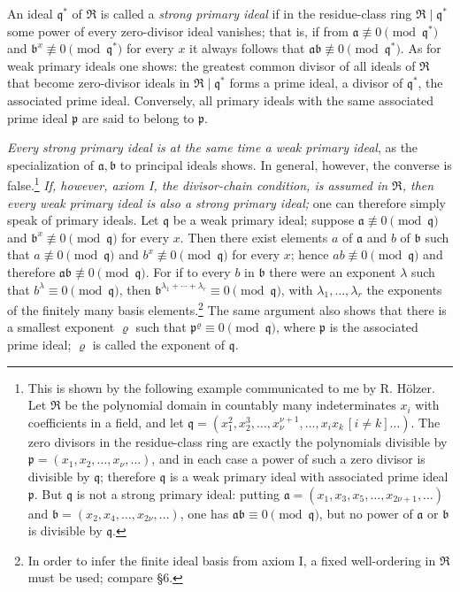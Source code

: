 \documentclass[11pt]{article}
\providecommand{\mR}{\mathfrak{R}}
\providecommand{\ma}{\mathfrak{a}}
\providecommand{\mb}{\mathfrak{b}}
\providecommand{\mpideal}{\mathfrak{p}}
\providecommand{\mq}{\mathfrak{q}}
\begin{document}
An ideal $\mq^*$ of $\mR$ is called a \emph{strong primary ideal} if in the residue-class ring $\mR\mid\mq^*$ some power of every zero-divisor ideal vanishes; that is, if from $\ma\not\equiv0\pmod{\mq^*}$ and $\mb^x\not\equiv0\pmod{\mq^*}$ for every $x$ it always follows that $\ma\mb\not\equiv0\pmod{\mq^*}$. As for weak primary ideals one shows: the greatest common divisor of all ideals of $\mR$ that become zero-divisor ideals in $\mR\mid\mq^*$ forms a prime ideal, a divisor of $\mq^*$, the associated prime ideal. Conversely, all primary ideals with the same associated prime ideal $\mpideal$ are said to belong to $\mpideal$.

\emph{Every strong primary ideal is at the same time a weak primary ideal}, as the specialization of $\ma,\mb$ to principal ideals shows. In general, however, the converse is false.\footnote{This is shown by the following example communicated to me by R. Hölzer. Let $\mR$ be the polynomial domain in countably many indeterminates $x_i$ with coefficients in a field, and let $\mq=(x_1^2,x_2^3,\ldots,x_\nu^{\nu+1},\ldots,x_i x_k\,[i\ne k]\ldots)$. The zero divisors in the residue-class ring are exactly the polynomials divisible by $\mpideal=(x_1,x_2,\ldots,x_\nu,\ldots)$, and in each case a power of such a zero divisor is divisible by $\mq$; therefore $\mq$ is a weak primary ideal with associated prime ideal $\mpideal$. But $\mq$ is not a strong primary ideal: putting $\ma=(x_1,x_3,x_5,\ldots,x_{2\nu+1},\ldots)$ and $\mb=(x_2,x_4,\ldots,x_{2\nu},\ldots)$, one has $\ma\mb\equiv0\pmod{\mq}$, but no power of $\ma$ or $\mb$ is divisible by $\mq$.} \emph{If, however, axiom I, the divisor-chain condition, is assumed in $\mR$, then every weak primary ideal is also a strong primary ideal;} one can therefore simply speak of primary ideals. Let $\mq$ be a weak primary ideal; suppose $\ma\not\equiv0\pmod{\mq}$ and $\mb^x\not\equiv0\pmod{\mq}$ for every $x$. Then there exist elements $a$ of $\ma$ and $b$ of $\mb$ such that $a\not\equiv0\pmod{\mq}$ and $b^x\not\equiv0\pmod{\mq}$ for every $x$; hence $ab\not\equiv0\pmod{\mq}$ and therefore $\ma\mb\not\equiv0\pmod{\mq}$. For if to every $b$ in $\mb$ there were an exponent $\lambda$ such that $b^\lambda\equiv0\pmod{\mq}$, then $\mb^{\lambda_1+\cdots+\lambda_r}\equiv0\pmod{\mq}$, with $\lambda_1,\ldots,\lambda_r$ the exponents of the finitely many basis elements.\footnote{In order to infer the finite ideal basis from axiom I, a fixed well-ordering in $\mR$ must be used; compare §6.} The same argument also shows that there is a smallest exponent $\varrho$ such that $\mpideal^\varrho\equiv0\pmod{\mq}$, where $\mpideal$ is the associated prime ideal; $\varrho$ is called the exponent of $\mq$.
\end{document}
